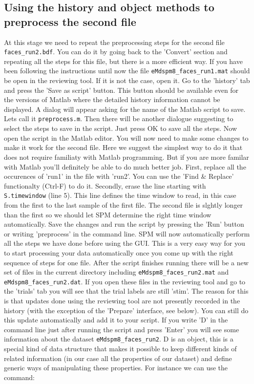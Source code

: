 \subsection{Using the history and object methods to preprocess the second file}
At this stage we need to repeat the preprocessing steps for the second file \texttt{faces_run2.bdf}. You can do it by going back to the 'Convert' section and repeating all the steps for this file, but there is a more efficient way. If you have been following the instructions until now the file \texttt{eMdspm8\_faces_run1.mat} should be open in the reviewing tool. If it is not the case, open it. Go to the 'history' tab and press the 'Save as script' button. This button should be available even for the versions of Matlab where the detailed history information cannot be displayed. A dialog will appear asking for the name of the Matlab script to save. Lets call it \texttt{preprocess.m}. Then there will be another dialogue suggesting to select the steps to save in the script. Just press OK to save all the steps. Now open the script in the Matlab editor. You will now need to make some changes to make it work for the second file. Here we suggest the simplest way to do it that does not require familiaty with Matlab programming. But if you are more familar with Matlab you'll definitely be able to do much better job. First, replace all the occurences of 'run1' in the file with 'run2'. You can use the 'Find & Replace' functionalty (Ctrl-F) to do it. Secondly, erase the line starting with \verb!S.timewindow! (line 5). This line defines the time window to read, in this case from the first to the last sample of the first file. The second file is slghtly longer than the first so we should let SPM determine the right time window automatically. Save the changes and run the script by pressing the 'Run' button or writing 'preprocess' in the command line. SPM will now automatically perform all the steps we have done before using the GUI. This is a very easy way for you to start processing your data automatically once you come up with the right sequence of steps for one file. After the script finishes running there will be a new set of files in the current directory including \texttt{eMdspm8\_faces_run2.mat} and \texttt{eMdspm8\_faces_run2.dat}. If you open these files in the reviewing tool and go to the 'trials' tab you will see that the trial labels are still 'stim'. The reason for this is that updates done using the reviewing tool are not presently recorded in the history (with the exception of the 'Prepare' interface, see below). You can still do this update automatically and add it to your script. If you write 'D' in the command line just after running the script and press 'Enter' you will see some information about the dataset \texttt{eMdspm8\_faces_run2}. D is an object, this is a special kind of data structure that makes it possible to keep different kinds of related information (in our case all the properties of our dataset) and define generic ways of manipulating these properties. For instance we can use the command:
